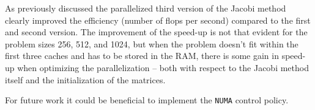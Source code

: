 As previously discussed the parallelized third version of the Jacobi method clearly improved the efficiency (number of flops per second) compared to the first and second version. The improvement of the speed-up is not that evident for the problem sizes 256, 512, and 1024, but when the problem doesn't fit within the first three caches and has to be stored in the RAM, there is some gain in speed-up when optimizing the parallelization – both with respect to the Jacobi method itself and the initialization of the matrices.

For future work it could be beneficial to implement the \texttt{NUMA} control policy.
